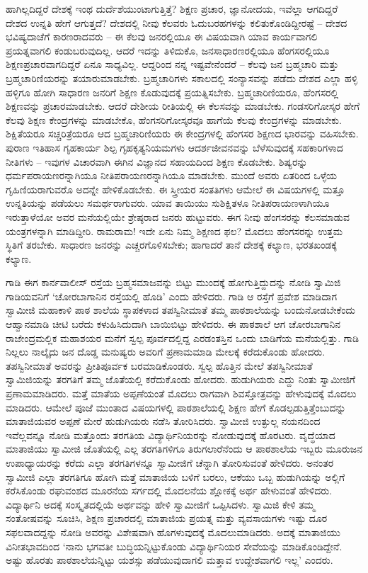 ಹಾಗಿಲ್ಲದಿದ್ದರೆ ದೇಶಕ್ಕೆ ಇಂಥ ದುರ್ದೆಶೆಯುಂಟಾಗುತ್ತಿತ್ತೆ? ಶಿಕ್ಷಣ ಪ್ರಚಾರ, ಜ್ಞಾನೋದಯ, ಇವೆಲ್ಲಾ ಆಗದಿದ್ದರೆ ದೇಶದ ಉನ್ನತಿ ಹೇಗೆ ಆಗುತ್ತದೆ? ದೇಶದಲ್ಲಿ ನೀವು ಕೆಲವರು ಓದುಬರಹಗಳನ್ನು ಕಲಿತುಕೊಂಡಿದ್ದೀರಷ್ಟೆ – ದೇಶದ ಭವಿಷ್ಯದಾಚೆಗೆ ಕಾರಣರಾದವರು – ಈ ಕೆಲವು ಜನರಲ್ಲಿಯೂ ಈ ವಿಷಯವಾಗಿ ಯಾವ ಕಾರ್ಯವಾಗಲಿ ಪ್ರಯತ್ನವಾಗಲಿ ಕಂಡುಬರುವುದಿಲ್ಲ. ಆದರೆ ಇದನ್ನು ತಿಳಿದುಕೊ, ಜನಸಾಧಾರಣರಲ್ಲಿಯೂ ಹೆಂಗಸರಲ್ಲಿಯೂ ಶಿಕ್ಷಣಪ್ರಚಾರವಾಗದಿದ್ದರೆ ಏನೂ ಸಾಧ್ಯವಿಲ್ಲ. ಆದ್ದರಿಂದ ನನ್ನ ಇಷ್ಟವೇನೆಂದರೆ – ಕೆಲವು ಜನ ಬ್ರಹ್ಮಚಾರಿ ಮತ್ತು ಬ್ರಹ್ಮಚಾರಿಣಿಯರನ್ನು ತಯಾರುಮಾಡಬೇಕು. ಬ್ರಹ್ಮಚಾರಿಗಳು ಸಕಾಲದಲ್ಲಿ ಸಂನ್ಯಾಸವನ್ನು ಪಡೆದು ದೇಶದ ಎಲ್ಲಾ ಹಳ್ಳಿ ಹಳ್ಳಿಗೂ ಹೋಗಿ ಸಾಧಾರಣ ಜನರಿಗೆ ಶಿಕ್ಷಣ ಕೊಡುವುದಕ್ಕೆ ಪ್ರಯತ್ನಿಸಬೇಕು. ಬ್ರಹ್ಮಚಾರಿಣಿಯರೂ, ಹೆಂಗಸರಲ್ಲಿ ಶಿಕ್ಷಣವನ್ನು ಪ್ರಚಾರಮಾಡಬೇಕು. ಆದರೆ ದೇಶೀಯ ರೀತಿಯಲ್ಲಿ ಈ ಕೆಲಸವನ್ನು ಮಾಡಬೇಕು. ಗಂಡಸರಿಗೋಸ್ಕರ ಹೇಗೆ ಕೆಲವು ಶಿಕ್ಷಣ ಕೇಂದ್ರಗಳನ್ನು ಮಾಡಬೇಕೊ, ಹೆಂಗಸರಿಗೋಸ್ಕರವೂ ಹಾಗೆಯೆ ಕೆಲವು ಕೇಂದ್ರಗಳನ್ನು ಮಾಡಬೇಕು. ಶಿಕ್ಷಿತೆಯರೂ ಸಚ್ಚರಿತ್ರೆಯರೂ ಆದ ಬ್ರಹ್ಮಚಾರಿಣಿಯರು ಈ ಕೇಂದ್ರಗಳಲ್ಲಿ ಹೆಂಗಸರ ಶಿಕ್ಷಣದ ಭಾರವನ್ನು ವಹಿಸಬೇಕು. ಪುರಾಣ ಇತಿಹಾಸ ಗೃಹಕಾರ್ಯ ಶಿಲ್ಪ ಗೃಹಕೃತ್ಯನಿಯಮಗಳು ಆದರ್ಶಜೀವನವನ್ನು ಬೆಳೆಸುವುದಕ್ಕೆ ಸಹಕಾರಿಗಳಾದ ನೀತಿಗಳು – ಇವುಗಳ ವಿಚಾರವಾಗಿ ಈಗಿನ ವಿಜ್ಞಾನದ ಸಹಾಯದಿಂದ ಶಿಕ್ಷಣ ಕೊಡಬೇಕು. ಶಿಷ್ಯರನ್ನು ಧರ್ಮಪರಾಯಣರನ್ನಾಗಿಯೂ ನೀತಿಪರಾಯಣರನ್ನಾಗಿಯೂ ಮಾಡಬೇಕು. ಮುಂದೆ ಅವರು ಏತರಿಂದ ಒಳ್ಳೆಯ ಗೃಹಿಣಿಯರಾಗುವರೊ ಅದನ್ನೇ ಹೇಳಿಕೊಡಬೇಕು. ಈ ಸ್ತ್ರೀಯರ ಸಂತತಿಗಳು ಆಮೇಲೆ ಈ ವಿಷಯಗಳಲ್ಲಿ ಮತ್ತೂ ಉನ್ನತಿಯನ್ನು ಪಡೆಯಲು ಸಮರ್ಥರಾಗುವರು. ಯಾವ ತಾಯಿಯು ಸುಶಿಕ್ಷಿತಳೂ ನೀತಿಪರಾಯಣಳಾಗಿಯೂ ಇರುತ್ತಾಳೆಯೋ ಅವರ ಮನೆಯಲ್ಲಿಯೇ ಶ್ರೇಷ್ಠರಾದ ಜನರು ಹುಟ್ಟುವರು. ಈಗ ನೀವು ಹೆಂಗಸರನ್ನು ಕೆಲಸಮಾಡುವ ಯಂತ್ರಗಳನ್ನಾಗಿ ಮಾಡಿದ್ದೀರಿ. ರಾಮರಾಮ! ಇದೇ ಏನು ನಿಮ್ಮ ಶಿಕ್ಷಣದ ಫಲ? ಮೊದಲು ಹೆಂಗಸರನ್ನು ಉತ್ತಮ ಸ್ಥಿತಿಗೆ ತರಬೇಕು. ಸಾಧಾರಣ ಜನರನ್ನು ಎಚ್ಚರಗೊಳಿಸಬೇಕು; ಹಾಗಾದರೆ ತಾನೆ ದೇಶಕ್ಕೆ ಕಲ್ಯಾಣ, ಭರತಖಂಡಕ್ಕೆ ಕಲ್ಯಾಣ.

ಗಾಡಿ ಈಗ ಕಾರ್ನವಾಲೀಸ್ ರಸ್ತೆಯ ಬ್ರಹ್ಮಸಮಾಜವನ್ನು ಬಿಟ್ಟು ಮುಂದಕ್ಕೆ ಹೋಗುತ್ತಿದ್ದುದನ್ನು ನೋಡಿ ಸ್ವಾಮಿಜಿ ಗಾಡಿಯವನಿಗೆ ‘ಚೋರಬಾಗಾನಿನ ರಸ್ತೆಯಲ್ಲಿ ಹೊಡಿ’ ಎಂದು ಹೇಳಿದರು. ಗಾಡಿ ಆ ರಸ್ತೆಗೆ ಪ್ರವೇಶ ಮಾಡಿದಾಗ ಸ್ವಾಮೀಜಿ ಮಹಾಕಾಳಿ ಪಾಠ ಶಾಲೆಯ ಸ್ಥಾಪಕಳಾದ ತಪಸ್ವಿನೀಮಾತೆ ತಮ್ಮ ಪಾಠಶಾಲೆಯನ್ನು ಬಂದುನೋಡಬೇಕೆಂದು ಆಹ್ವಾನಮಾಡಿ ಚೀಟಿ ಬರೆದು ಕಳುಹಿಸಿದುದಾಗಿ ಬಾಯಿಬಿಟ್ಟು ಹೇಳಿದರು. ಈ ಪಾಠಶಾಲೆ ಆಗ ಚೋರಬಾಗಾನಿನ ರಾಜೇಂದ್ರಮಲ್ಲಿಕ ಮಹಾಶಯರ ಮನೆಗೆ ಸ್ವಲ್ಪ ಪೂರ್ವದಲ್ಲಿದ್ದ ಎರಡಂತಸ್ತಿನ ಒಂದು ಬಾಡಿಗೆಯ ಮನೆಯಲ್ಲಿತ್ತು. ಗಾಡಿ ನಿಲ್ಲಲು ನಾಲ್ಕೈದು ಜನ ದೊಡ್ಡ ಮನುಷ್ಯರು ಅವರಿಗೆ ಪ್ರಣಾಮಮಾಡಿ ಮೇಲಕ್ಕೆ ಕರೆದುಕೊಂಡು ಹೋದರು. ತಪಸ್ವಿನೀಮಾತೆ ಅವರನ್ನು ಪ್ರೀತಿಪೂರ್ವಕ ಬರಮಾಡಿಕೊಂಡರು. ಸ್ವಲ್ಪ ಹೊತ್ತಿನ ಮೇಲೆ ತಪಸ್ವಿನೀಮಾತೆ ಸ್ವಾಮಿಜಿಯನ್ನು ತರಗತಿಗೆ ತಮ್ಮ ಜೊತೆಯಲ್ಲಿ ಕರೆದುಕೊಂಡು ಹೋದರು. ಹುಡುಗಿಯರು ಎದ್ದು ನಿಂತು ಸ್ವಾಮೀಜಿಗೆ ಪ್ರಣಾಮಮಾಡಿದರು. ಮತ್ತೆ ಮಾತೆಯ ಅಪ್ಪಣೆಯಂತೆ ಮೊದಲು ರಾಗವಾಗಿ ಶಿವಸ್ತೋತ್ರವನ್ನು ಹೇಳುವುದಕ್ಕೆ ಮೊದಲು ಮಾಡಿದರು. ಆಮೇಲೆ ಪೂಜೆ ಮುಂತಾದ ವಿಷಯಗಳಲ್ಲಿ ಪಾಠಶಾಲೆಯಲ್ಲಿ ಶಿಕ್ಷಣ ಹೇಗೆ ಕೊಡಲ್ಪಡುತ್ತಿತ್ತೆಂಬುದನ್ನು ಮಾತಾಜಿಯವರ ಅಪ್ಪಣೆ ಮೇರೆ ಹುಡುಗಿಯರು ನಡೆಸಿ ತೋರಿಸಿದರು. ಸ್ವಾಮೀಜಿ ಉತ್ಫುಲ್ಲ ನಯನದಿಂದ ಇವೆಲ್ಲವನ್ನೂ ನೋಡಿ ಮತ್ತೊಂದು ತರಗತಿಯ ವಿದ್ಯಾರ್ಥಿನಿಯರನ್ನು ನೋಡುವುದಕ್ಕೆ ಹೊರಟರು. ವೃದ್ಧೆಯಾದ ಮಾತಾಜಿಯು ಸ್ವಾಮೀಜಿ ಜೊತೆಯಲ್ಲಿ ಎಲ್ಲ ತರಗತಿಗಳಿಗೂ ತಿರುಗಲಾರೆನೆಂದು ಆ ಪಾಠಶಾಲೆಯ ಇಬ್ಬರು ಮೂರುಜನ ಉಪಾಧ್ಯಾಯರನ್ನು ಕರೆದು ಎಲ್ಲಾ ತರಗತಿಗಳನ್ನೂ ಸ್ವಾಮೀಜಿಗೆ ಚೆನ್ನಾಗಿ ತೋರಿಸುವಂತೆ ಹೇಳಿದರು. ಅನಂತರ ಸ್ವಾಮೀಜಿ ಎಲ್ಲಾ ತರಗತಿಗೂ ಹೋಗಿ ಮತ್ತೆ ಮಾತಾಜಿಯ ಬಳಿಗೆ ಬರಲು, ಆಕೆಯು ಒಬ್ಬ ಹುಡುಗಿಯನ್ನು ಅಲ್ಲಿಗೆ ಕರೆಸಿಕೊಂಡು ರಘುವಂಶದ ಮೂರನೆಯ ಸರ್ಗದಲ್ಲಿ ಮೊದಲನೆಯ ಶ್ಲೋಕಕ್ಕೆ ಅರ್ಥ ಹೇಳುವಂತೆ ಹೇಳಿದರು. ವಿದ್ಯಾರ್ಥಿನಿ ಅದಕ್ಕೆ ಸಂಸ್ಕೃತದಲ್ಲಿಯೆ ಅರ್ಥವನ್ನು ಹೇಳಿ ಸ್ವಾಮೀಜಿಗೆ ಒಪ್ಪಿಸಿದಳು. ಸ್ವಾಮಿಜಿ ಕೇಳಿ ತಮ್ಮ ಸಂತೋಷವನ್ನು ಸೂಚಿಸಿ, ಶಿಕ್ಷಣ ಪ್ರಚಾರದಲ್ಲಿ ಮಾತಾಜಿಯ ಪ್ರಯತ್ನ ಮತ್ತು ವ್ಯವಸಾಯಗಳು ಇಷ್ಟು ದೂರ ಸಫಲವಾದದ್ದನ್ನು ನೋಡಿ ಅವರನ್ನು ವಿಶೇಷವಾಗಿ ಹೊಗಳುವುದಕ್ಕೆ ಮೊದಲುಮಾಡಿದರು. ಅದಕ್ಕೆ ಮಾತಾಜಿಯು ವಿನೀತಭಾವದಿಂದ ‘ನಾನು ಭಗವತೀ ಬುದ್ಧಿಯನ್ನಿಟ್ಟುಕೊಂಡು ವಿದ್ಯಾರ್ಥಿನಿಯರ ಸೇವೆಯನ್ನು ಮಾಡಿಕೊಂಡಿದ್ದೇನೆ. ಅಷ್ಟು ಹೊರತು ಪಾಠಶಾಲೆಯನ್ನಿಟ್ಟು ಯಶಸ್ಸು ಪಡೆಯುವುದಾಗಲಿ ಮತ್ತಾವ ಉದ್ದೇಶವಾಗಲಿ ಇಲ್ಲ’ ಎಂದರು.

